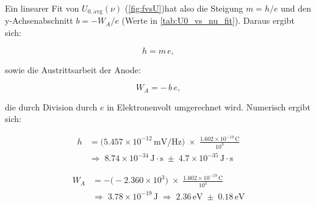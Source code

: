 \begin{table}[H]
\centering
{}
\caption{Ergebnisse des gewichteten linearen $\mathrm{\chi}^2$-Fits von $\overline{U_0}$ gegen $\nu$.}
\label{tab:U0_vs_nu_fit}
\end{table}
\FloatBarrier

Ein linearer Fit von $U_{0,\mathrm{avg}}(\nu)$ (\cref{fig:fvsU})hat also die Steigung $m = h/e$ und den y-Achsenabschnitt $b = -W_{A}/e$ (Werte in \cref{tab:U0_vs_nu_fit}). Daraus ergibt sich:


\begin{equation}
  h = m\,e,
\end{equation}

sowie die Austrittsarbeit der Anode:

\begin{equation}
  W_{A} = -\,b\,e,
\end{equation}

die durch Division durch $e$ in Elektronenvolt umgerechnet wird. Numerisch ergibt sich:

\begin{equation}
\begin{split}
  h &= \bigl(5.457\times10^{-12}\,\mathrm{mV/Hz}\bigr)\;\times\;\frac{1.602\times10^{-19}\,\mathrm{C}}{10^3}\\
    &\Longrightarrow\;8.74\times10^{-34}\,\mathrm{J\cdot s}\;\pm\;4.7\times10^{-35}\,\mathrm{J\cdot s}
\end{split}
\end{equation}

\begin{equation}
\begin{split}
  W_{A} &= -\bigl(-2.360\times10^{3}\bigr)\;\times\;\frac{1.602\times10^{-19}\,\mathrm{C}}{10^3}\\
        &\Longrightarrow\;3.78\times10^{-19}\,\mathrm{J}
         \;\Longrightarrow\;2.36\,\mathrm{eV}\;\pm\;0.18\,\mathrm{eV}
\end{split}
\end{equation}

